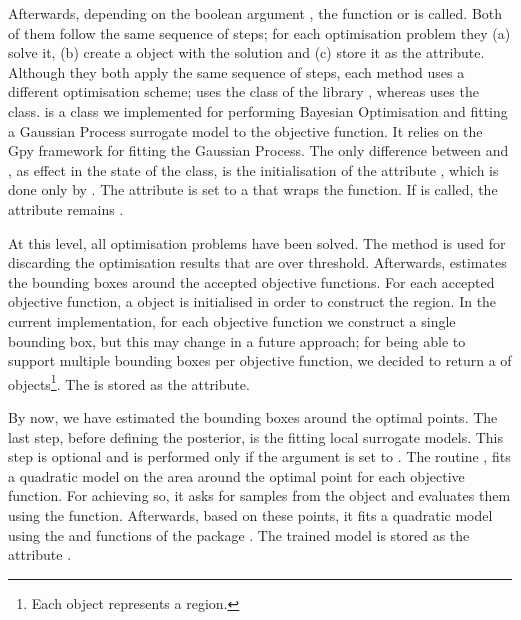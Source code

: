 Afterwards, depending on the boolean argument
, the function \linebreak {}
or  is called. Both of them follow the same
sequence of steps; for each optimisation problem they (a) solve it,
(b) create a  object with the solution
and (c) store it as the 
attribute. Although they both apply the same sequence of steps, each
method uses a different optimisation scheme;
 uses the  class of the
 library \cite{2020SciPy-NMeth}, whereas
 uses the  class.
 is a class we implemented for performing
Bayesian Optimisation and fitting a Gaussian Process surrogate model
to the objective function. It relies on the Gpy framework
\cite{gpy2014} for fitting the Gaussian Process. The only
difference between  and ,
as effect in the state of the  class, is
the initialisation of the attribute 
, which is done only by
. The attribute is set to a  that
wraps the  function. If
 is called, the attribute remains
.

At this level, all optimisation problems have been solved. The method
 is used for discarding the optimisation
results that are over threshold. Afterwards, 
estimates the bounding boxes around the accepted objective
functions. For each accepted objective function, a
 object is initialised in order to
construct the region. In the current implementation, for each
objective function we construct a single bounding box, but this may
change in a future approach; for being able to support multiple
bounding boxes per objective function, we decided to return a
 of  objects\footnote{Each
   object represents a region.}. The
 is stored as the 
attribute.

By now, we have estimated the bounding boxes around the optimal
points. The last step, before defining the posterior, is the fitting
local surrogate models. This step is optional and is performed only
if the argument  is set to . The
routine , fits a quadratic model on the area
around the optimal point for each objective function. For achieving
so, it asks for samples from the  object and
evaluates them using the 
function. Afterwards, based on these points, it fits a quadratic model
using the  and
 functions of the
 package \cite{scikit-learn}. The trained
model is stored as the attribute
.


